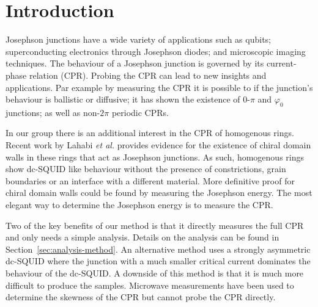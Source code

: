 \chapter{Introduction}
Josephson junctions have a wide variety of applications such as qubits\cite{placeNewMaterialPlatform2021,pechenezhskiySuperconductingQuasichargeQubit2020}; superconducting electronics through Josephson diodes\cite{zhangReconfigurableMagneticfieldfreeSuperconducting2023a,ciacciaGateTunableJosephson2023}; and microscopic imaging techniques\cite{clarkeSQUIDHandbook2004,rogSQUIDontipMagneticMicroscopy2022,pranceSensitivityDCSQUID2023}. The behaviour of a Josephson junction is governed by its current-phase relation (CPR). Probing the CPR can lead to new insights and applications. Par example by measuring the CPR it is possible to if the junction's behaviour is ballistic or diffusive\cite{muraniBallisticEdgeStates2017,endresCurrentPhaseRelation2023,kayyalhaHighlySkewedCurrent2020}; it has shown the existence of $0$-$\pi$ and $\varphi_0$ junctions\cite{frolovMeasurementCurrentPhaseRelation2004,muraniBallisticEdgeStates2017,strambiniJosephsonPhaseBattery2020,szombatiJosephsonPh0junctionNanowire2016}; as well as non-$2\pi$ periodic CPRs\cite{endresCurrentPhaseRelation2023}.

In our group there is an additional interest in the CPR of homogenous  rings. Recent work by Lahabi \textit{et al.} provides evidence for the existence of chiral domain walls in these rings that act as Josephson junctions.\cite{lahabiSpintripletSupercurrentsOdd2018} As such, homogenous  rings show dc-SQUID like behaviour without the presence of constrictions, grain boundaries or an interface with a different material. More definitive proof for chiral domain walls could be found by measuring the Josephson energy.\cite{lahabiSpintripletSupercurrentsOdd2018,sigristRoleDomainWalls1999} The most elegant way to determine the Josephson energy is to measure the CPR.

Two of the key benefits of our method is that it directly measures the full CPR and only needs a simple analysis. Details on the analysis can be found in Section~\ref{sec:analysis-method}. An alternative method uses a strongly asymmetric dc-SQUID where the junction with a much smaller critical current dominates the behaviour of the dc-SQUID.\cite{muraniBallisticEdgeStates2017,dellaroccaMeasurementCurrentPhaseRelation2007} A downside of this method is that it is much more difficult to produce the samples. Microwave measurements have been used to determine the skewness of the CPR but cannot probe the CPR directly.\cite{schmidtProbingCurrentphaseRelation2020}

